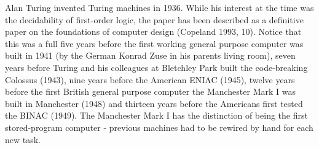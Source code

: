 \documentclass[../../include/open-logic-section]{subfiles}
\begin{document}
\begin{explain}
Alan Turing invented Turing machines in 1936. While his interest at the
time was the decidability of first-order logic, the paper has been
described as a definitive paper on the foundations of computer design
(Copeland 1993, 10). Notice that this was a full five years before the
first working general purpose computer was built in 1941 (by the German
Konrad Zuse in his parents living room), seven years before Turing and his
colleagues at Bletchley Park built the code-breaking Colossus (1943), nine
years before the American ENIAC (1945), twelve years before the first
British general purpose computer the Manchester Mark I was built in
Manchester (1948) and thirteen years before the Americans first tested the
BINAC (1949). The Manchester Mark I has the distinction of being the first
stored-program computer - previous machines had to be rewired by hand for
each new task. \end{explain}
\end{document}
